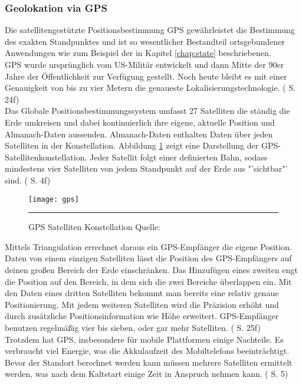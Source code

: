 \subsubsection{Geolokation via \gls{GPS}}
Die satellitengestützte Positionsbestimmung \gls{GPS} gewährleistet die Bestimmung des exakten Standpunktes und ist so wesentlicher Bestandteil ortsgebundener Anwendungen wie zum Beispiel der in Kapitel \ref{chap:state} beschriebenen. \\
\gls{GPS} wurde ursprünglich vom US-Militär entwickelt und dann Mitte der 90er Jahre der Öffentlichkeit zur Verfügung gestellt. Noch heute bleibt es mit einer Genauigkeit von bis zu vier Metern die genaueste Lokalisierungstechnologie. (\cite{gps} S. 24f)\\
Das Globale Positionsbestimmungssystem umfasst 27 Satelliten die ständig die Erde umkreisen und dabei kontinuierlich ihre eigene, aktuelle Position und Almanach-Daten aussenden. Almanach-Daten enthalten Daten über jeden Satelliten in der Konstellation. Abbildung \ref{fig:gps} zeigt eine Darstellung der GPS-Satellitenkonstellation. Jeder Satellit folgt einer definierten Bahn, sodass mindestens vier Satelliten von jedem Standpunkt auf der Erde aus "'sichtbar"' sind. (\cite{location} S. 4f)
\begin{figure}[H]  
    \centering  
    \texttt{[image: gps]} 
    \rule{35em}{0.5pt}
    \caption[GPS Satelliten Konstellation]{GPS Satelliten Konstellation  Quelle: \cite{fig:gps}}
    \label{fig:gps}
\end{figure}
Mittels Triangulation errechnet daraus ein \gls{GPS}-Empfänger die eigene Position. Daten von einem einzigen Satelliten lässt die Position des \gls{GPS}-Empfängers auf deinen großen Bereich der Erde einschränken. Das Hinzufügen eines zweiten engt die Position auf den Bereich, in dem sich die zwei Bereiche überlappen ein. Mit den Daten eines dritten Satelliten bekommt man bereits eine relativ genaue Positionierung. Mit jedem weiteren Satelliten wird die Präzision erhöht und durch zusätzliche Positionsinformation wie Höhe erweitert. \gls{GPS}-Empfänger benutzen regelmäßig vier bis sieben, oder gar mehr Satelliten. (\cite{gps} S. 25f)\\
Trotzdem hat \gls{GPS}, insbesondere für mobile Plattformen einige Nachteile. Es verbraucht viel Energie, was die Akkulaufzeit des Mobiltelefons beeinträchtigt. Bevor der Standort berechnet werden kann müssen mehrere Satelliten ermittelt werden, was nach dem Kaltstart einige Zeit in Anspruch nehmen kann. (\cite{location} S. 5)
